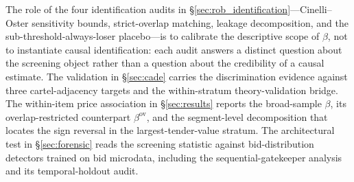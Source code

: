 The role of the four identification audits in
\S\ref{sec:rob_identification}---Cinelli--Oster sensitivity
bounds, strict-overlap matching, leakage decomposition, and the
sub-threshold-always-loser placebo---is to calibrate the
descriptive scope of $\beta$, not to instantiate causal
identification: each audit answers a distinct question about the
screening object rather than a question about the credibility of
a causal estimate. The validation in \S\ref{sec:cade} carries
the discrimination evidence against three cartel-adjacency
targets and the within-stratum theory-validation bridge. The
within-item price association in \S\ref{sec:results} reports the
broad-sample $\beta$, its overlap-restricted counterpart
$\beta^{\text{ov}}$, and the segment-level decomposition that
locates the sign reversal in the largest-tender-value stratum.
The architectural test in \S\ref{sec:forensic} reads the
screening statistic against bid-distribution detectors trained
on bid microdata, including the sequential-gatekeeper analysis
and its temporal-holdout audit.
